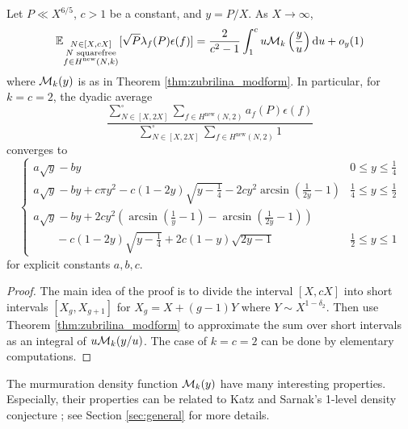 \begin{theorem}
    \label{thm:zubrilina_geom}
    Let $P \ll X^{6/5}$, $c > 1$ be a constant, and $y = P / X$. As $X \to \infty$,
    \begin{equation}
        \mathbb{E}_{\substack{N \in [X, cX] \\ N \text{ squarefree} \\ f \in H^{\text{new}}(N, k)}} [\sqrt{P} \lambda_f(P) \epsilon(f)] = \frac{2}{c^2 - 1} \int_1^c u \mathcal{M}_{k}\left(\frac{y}{u} \right) \mathrm{d} u + o_y(1)
    \end{equation}
    where $\mathcal{M}_k(y)$ is as in Theorem \ref{thm:zubrilina_modform}.
    In particular, for $k = c = 2$, the dyadic average
    \begin{equation}
        \frac{\sum_{N \in [X, 2X]}^{\square} \sum_{f \in H^{\text{new}}(N, 2)} a_f(P) \epsilon(f)}{\sum_{N \in [X, 2X]}^{\square} \sum_{f \in H^{\text{new}}(N, 2)} 1}
    \end{equation}
    converges to
    \begin{equation}
        \begin{cases}
            a \sqrt{y} - b y & 0 \le y \le \frac{1}{4} \\
            a\sqrt{y} - by + c \pi y^2 - c (1 - 2y) \sqrt{y - \frac{1}{4}} - 2 c y^2 \arcsin\left(\frac{1}{2y} - 1\right)& \frac{1}{4} \le y \le \frac{1}{2} \\
            a \sqrt{y} - by + 2cy^2 \left(\arcsin\left(\frac{1}{y} - 1\right) - \arcsin\left(\frac{1}{2y} - 1 \right)\right) & \\
            \quad\quad -c(1 - 2y) \sqrt{y - \frac{1}{4}} + 2c (1 - y) \sqrt{2y - 1} & \frac{1}{2} \le y \le 1
        \end{cases}
    \end{equation}
    for explicit constants $a, b, c$.
\end{theorem}
\begin{proof}
    The main idea of the proof is to divide the interval $[X, cX]$ into short intervals $[X_g, X_{g+1}]$ for $X_g = X + (g - 1)Y$ where $Y \sim X^{1 - \delta_2}$.
    Then use Theorem \ref{thm:zubrilina_modform} to approximate the sum over short intervals as an integral of $u \mathcal{M}_k(y/u)$.
    The case of $k = c = 2$ can be done by elementary computations.
\end{proof}

The murmuration density function $\mathcal{M}_k(y)$ have many interesting properties.
Especially, their properties can be related to Katz and Sarnak's 1-level density conjecture \cite{katz1999zeroes}; see Section \ref{sec:general} for more details.


